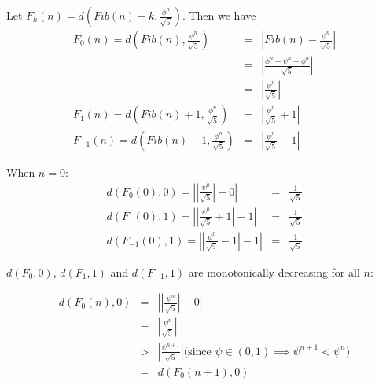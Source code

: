 \documentclass{minimal}
\begin{document}
Let $F_k(n) = d(Fib(n)+ k, \frac{\phi^n}{\sqrt{5}})$. Then we have
\begin{eqnarray*}
  F_0(n) = d(Fib(n), \frac{\phi^n}{\sqrt{5}}) &=& \left|Fib(n) - \frac{\phi^n}{\sqrt{5}}\right|
  \\ &=& \left|\frac{\phi^n - \psi^n - \phi^n}{\sqrt{5}}\right|
  \\ &=& \left|\frac{\psi^n}{\sqrt{5}}\right|
  \\ F_1(n) = d(Fib(n) + 1, \frac{\phi^n}{\sqrt{5}}) &=& \left|\frac{\psi^n}{\sqrt{5}} + 1\right|
  \\ F_{-1}(n) = d(Fib(n) - 1, \frac{\phi^n}{\sqrt{5}}) &=& \left|\frac{\psi^n}{\sqrt{5}} - 1\right|
\end{eqnarray*}

When $n = 0$:
\begin{eqnarray*}
  d(F_0(0), 0) = \left|\left|\frac{\psi^0}{\sqrt{5}}\right| - 0\right| &=& \frac{1}{\sqrt{5}}
  \\ d(F_1(0), 1) = \left|\left|\frac{\psi^0}{\sqrt{5}} + 1\right| - 1\right| &=& \frac{1}{\sqrt{5}}
  \\ d(F_{-1}(0), 1) = \left|\left|\frac{\psi^0}{\sqrt{5}} - 1\right| - 1\right| &=& \frac{1}{\sqrt{5}}
\end{eqnarray*}




$d(F_0, 0)$, $d(F_1, 1)$ and $d(F_{-1}, 1)$ are monotonically decreasing for all $n$:

\begin{eqnarray*}
  d(F_0(n), 0) &=& \left|\left|\frac{\psi^n}{\sqrt{5}}\right| - 0\right|
            \\ &=& \left|\frac{\psi^n}{\sqrt{5}}\right|
            \\ &>& \left|\frac{\psi^{n+1}}{\sqrt{5}}\right| \text{(since $\psi \in (0,1) \implies \psi^{n+1} < \psi^n$)}
            \\ &=& d(F_0(n+1), 0)
\end{eqnarray*}
\end{document}

